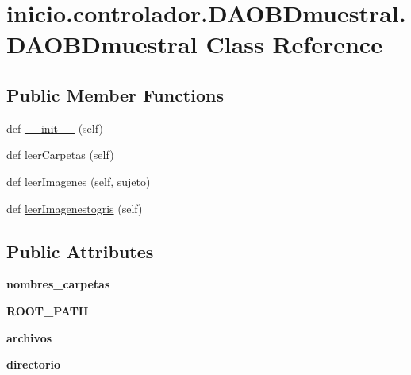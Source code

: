 \hypertarget{classinicio_1_1controlador_1_1_d_a_o_b_dmuestral_1_1_d_a_o_b_dmuestral}{}\section{inicio.\+controlador.\+D\+A\+O\+B\+Dmuestral.\+D\+A\+O\+B\+Dmuestral Class Reference}
\label{classinicio_1_1controlador_1_1_d_a_o_b_dmuestral_1_1_d_a_o_b_dmuestral}
\subsection*{Public Member Functions}
\begin{DoxyCompactItemize}
\item 
def \hyperlink{classinicio_1_1controlador_1_1_d_a_o_b_dmuestral_1_1_d_a_o_b_dmuestral_a6e8153ebcae2306cb20635be243cc438}{\+\_\+\+\_\+init\+\_\+\+\_\+} (self)
\item 
def \hyperlink{classinicio_1_1controlador_1_1_d_a_o_b_dmuestral_1_1_d_a_o_b_dmuestral_a551bd3a5bdfb843dd18cf09663bc304a}{leer\+Carpetas} (self)
\item 
def \hyperlink{classinicio_1_1controlador_1_1_d_a_o_b_dmuestral_1_1_d_a_o_b_dmuestral_a96639d1b3cecf4cdff96945365e0e07d}{leer\+Imagenes} (self, sujeto)
\item 
def \hyperlink{classinicio_1_1controlador_1_1_d_a_o_b_dmuestral_1_1_d_a_o_b_dmuestral_a94af6883d0678962ca7e093ac9868ce0}{leer\+Imagenestogris} (self)
\end{DoxyCompactItemize}
\subsection*{Public Attributes}
\begin{DoxyCompactItemize}
\item 
\mbox{\label{classinicio_1_1controlador_1_1_d_a_o_b_dmuestral_1_1_d_a_o_b_dmuestral_a4bc996dda1518f7be20a20aeaff9e50a}} 
{\bfseries nombres\+\_\+carpetas}
\item 
\mbox{\label{classinicio_1_1controlador_1_1_d_a_o_b_dmuestral_1_1_d_a_o_b_dmuestral_a50affef13594d741ed049dda0099cb7b}} 
{\bfseries R\+O\+O\+T\+\_\+\+P\+A\+TH}
\item 
\mbox{\label{classinicio_1_1controlador_1_1_d_a_o_b_dmuestral_1_1_d_a_o_b_dmuestral_ac45a3f6d2ca4e8e790506ce6dc4e199b}} 
{\bfseries archivos}
\item 
\mbox{\label{classinicio_1_1controlador_1_1_d_a_o_b_dmuestral_1_1_d_a_o_b_dmuestral_ae1f875682fde84f25d85858690679f48}} 
{\bfseries directorio}
\end{DoxyCompactItemize}


